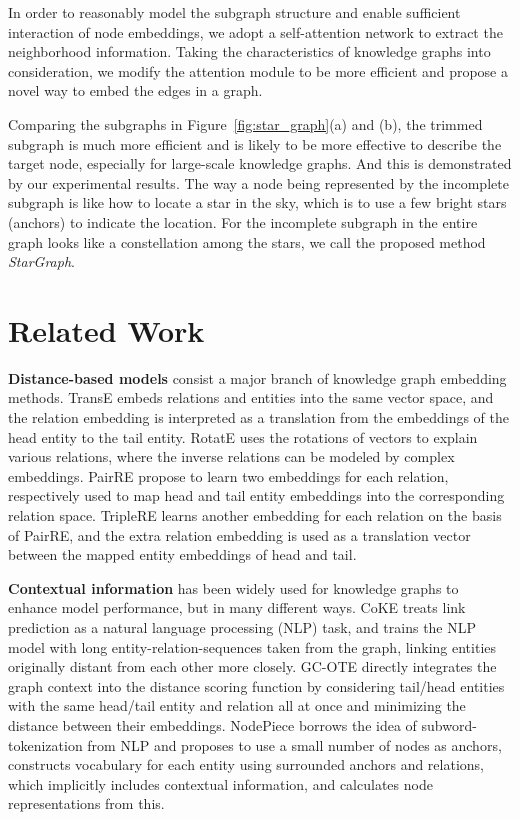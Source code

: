 \documentclass{article}
\begin{document}
In order to reasonably model the subgraph structure and enable sufficient interaction of node embeddings, we adopt a self-attention network to extract the neighborhood information. Taking the characteristics of knowledge graphs into consideration, we modify the attention module to be more efficient and propose a novel way to embed the edges in a graph.

Comparing the subgraphs in Figure~\ref{fig:star_graph}(a) and (b), the trimmed subgraph is much more efficient and is likely to be more effective to describe the target node, especially for large-scale knowledge graphs. And this is demonstrated by our experimental results.
The way a node being represented by the incomplete subgraph is like how to locate a star in the sky, which is to use a few bright stars (anchors) to indicate the location. For the incomplete subgraph in the entire graph looks like a constellation among the stars, we call the proposed method \emph{StarGraph}.

\section{Related Work}
\textbf{Distance-based models} consist a major branch of knowledge graph embedding methods.
TransE \cite{bordes2013translating} embeds relations and entities into the same vector space, and the relation embedding is interpreted as a translation from the embeddings of the head entity to the tail entity. RotatE \cite{sun2018rotate} uses the rotations of vectors to explain various relations, where the inverse relations can be modeled by complex embeddings. PairRE \cite{chao2021pairre} propose to learn two embeddings for each relation, respectively used to map head and tail entity embeddings into the corresponding relation space. TripleRE \cite{yu2021triplere} learns another embedding for each relation on the basis of PairRE, and the extra relation embedding is used as a translation vector between the mapped entity embeddings of head and tail.

\textbf{Contextual information} has been widely used for knowledge graphs to enhance model performance, but in many different ways. CoKE \cite{wang2019coke} treats link prediction as a natural language processing (NLP) task, and trains the NLP model with long entity-relation-sequences taken from the graph, linking entities originally distant from each other more closely. 
GC-OTE \cite{tang2020orthogonal} directly integrates the graph context into the distance scoring function by considering tail/head entities with the same head/tail entity and relation all at once and minimizing the distance between their embeddings.
NodePiece \cite{galkin2022nodepiece} borrows the idea of subword-tokenization from NLP and proposes to use a small number of nodes as anchors, constructs vocabulary for each entity using surrounded anchors and relations, which implicitly includes contextual information, and calculates node representations from this.
\end{document}
